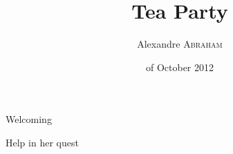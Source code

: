 \documentclass[a4paper]{meetrpt}
\author{Alexandre \textsc{Abraham}}
\title{Tea Party}
\date{\nth{20} of October 2012}
\begin{document}
\maketitle

\begin{business}{Welcoming \alice}
\subject{\alice is lost in Wonderland. We must welcome her with songs and riddles!}
\end{business}

\begin{business}{Help \alice in her quest}
\subject{\alice leaves because she is tired of the riddles.}
\conclusion{}
\end{business}
\end{document}
